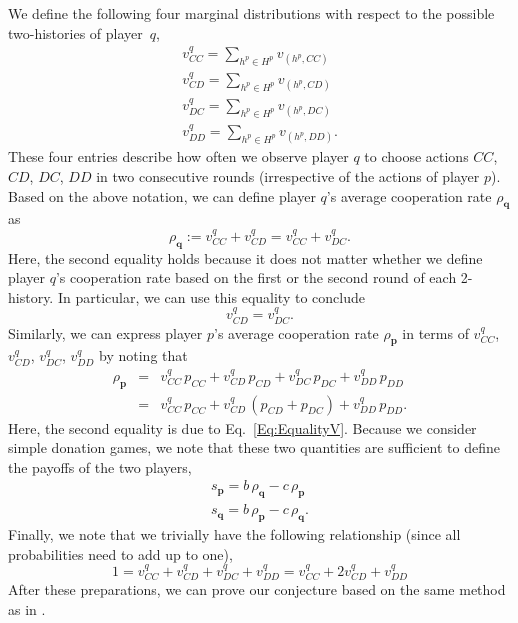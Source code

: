 \documentclass{article}
\theoremstyle{definition}
\begin{document}
We define the following four marginal distributions with respect to the possible two-histories of player~$q$, 
\begin{equation}
\begin{array}{l}
\displaystyle v^q_{CC} = \sum_{h^p\in H^p} v_{(h^p,CC)}\\
\displaystyle v^q_{CD} = \sum_{h^p\in H^p} v_{(h^p,CD)}\\
\displaystyle v^q_{DC} = \sum_{h^p\in H^p} v_{(h^p,DC)}\\
\displaystyle v^q_{DD} = \sum_{h^p\in H^p} v_{(h^p,DD)}.
\end{array}
\end{equation}
These four entries describe how often we observe player $q$ to choose actions $CC$, $CD$, $DC$, $DD$ in two consecutive rounds (irrespective of the actions of player $p$). Based on the above notation, we can define player $q$'s average cooperation rate $\rho_\mathbf{q}$ as 
\begin{equation} \label{Eq:rhoq}
\rho_\mathbf{q} := v^q_{CC} + v^q_{CD} = v^q_{CC} + v^q_{DC}.
\end{equation}
Here, the second equality holds because it does not matter whether we define player $q$'s cooperation rate based on the first or the second round of each 2-history. In particular, we can use this equality to conclude
\begin{equation} \label{Eq:EqualityV}
v^q_{CD} = v^q_{DC}.
\end{equation}
Similarly, we can express player $p$'s average cooperation rate $\rho_\mathbf{p}$ in terms of $v^q_{CC}$, $v^q_{CD}$, $v^q_{DC}$, $v^q_{DD}$ by noting that 
\begin{equation} \label{Eq:rhop}
\begin{array}{lll}
\rho_\mathbf{p} &= &\displaystyle v^q_{CC}\, p_{CC} +  v^q_{CD}\,p_{CD} + v^q_{DC}\, p_{DC} + v^q_{DD}\, p_{DD}\\[0.2cm]
	& =  &v^q_{CC}\, p_{CC} +  v^q_{CD}\,(p_{CD}\!+\!p_{DC}) + v^q_{DD}\, p_{DD}.
\end{array}
\end{equation}
Here, the second equality is due to Eq.~\eqref{Eq:EqualityV}. Because we consider simple donation games, we note that these two quantities are sufficient to define the payoffs of the two players, 
\begin{equation} \label{Eq:payoff}
\begin{array}{lll}
s_\mathbf{p} =  b\, \rho_\mathbf{q} - c\, \rho_\mathbf{p}\\
s_\mathbf{q} = b\, \rho_\mathbf{p} - c\, \rho_\mathbf{q}.
\end{array}
\end{equation}
Finally, we note that we trivially have the following relationship (since all probabilities need to add up to one), 
\begin{equation} \label{Eq:normalization}
1 = v^q_{CC} +  v^q_{CD} + v^q_{DC} + v^q_{DD} = v^q_{CC} +  2v^q_{CD} + v^q_{DD}
\end{equation}
After these preparations, we can prove our conjecture based on the same method as in \citet{akin:EGADS:2016}.
 
\end{document}
